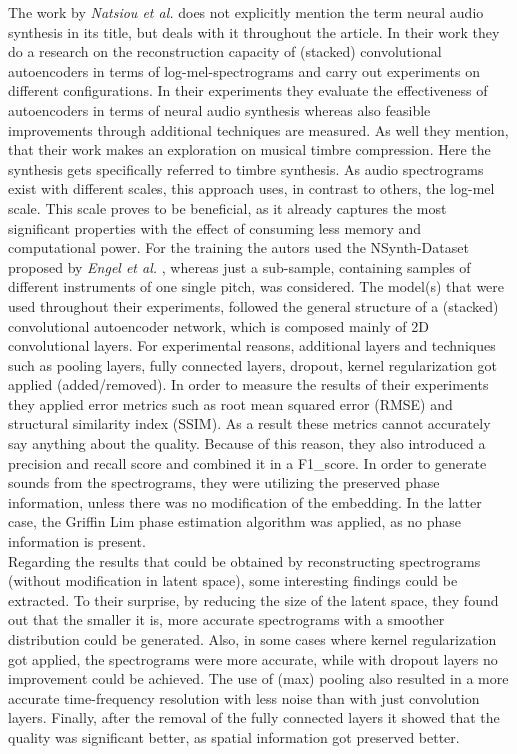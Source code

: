 The work by \textit{Natsiou et al.} does not explicitly mention the term neural audio synthesis in its title, but deals with it throughout the article. \cite{Natsiou2023} In their work they do a research on the reconstruction capacity of (stacked) convolutional autoencoders in terms of log-mel-spectrograms and carry out experiments on different configurations. In their experiments they evaluate the effectiveness of autoencoders in terms of neural audio synthesis whereas also feasible improvements through additional techniques are measured. As well they mention, that their work makes an exploration on musical timbre compression. Here the synthesis gets specifically referred to timbre synthesis. As audio spectrograms exist with different scales, this approach uses, in contrast to others, the log-mel scale. This scale proves to be beneficial, as it already captures the most significant properties with the effect of consuming less memory and computational power. For the training the autors used the NSynth-Dataset proposed by \textit{Engel et al. } \cite{Engel2017}, whereas just a sub-sample, containing samples of different instruments of one single pitch, was considered. The model(s) that were used throughout their experiments, followed the general structure of a (stacked) convolutional autoencoder network, which is composed mainly of 2D convolutional layers. For experimental reasons, additional layers and techniques such as pooling layers, fully connected layers, dropout, kernel regularization got applied (added/removed). In order to measure the results of their experiments they applied error metrics such as root mean squared error (RMSE) and structural similarity index (SSIM). As a result these metrics cannot accurately say anything about the quality. Because of this reason, they also introduced a precision and recall score and combined it in a F1\_score. In order to generate sounds from the spectrograms, they were utilizing the preserved phase information, unless there was no modification of the embedding. In the latter case, the Griffin Lim phase estimation algorithm was applied, as no phase information is present.\\
Regarding the results that could be obtained by reconstructing spectrograms (without modification in latent space), some interesting findings could be extracted. To their surprise, by reducing the size of the latent space, they found out that the smaller it is, more accurate spectrograms with a smoother distribution could be generated. Also, in some cases where kernel regularization got applied, the spectrograms were more accurate, while with dropout layers no improvement could be achieved. The use of (max) pooling also resulted in a more accurate time-frequency resolution with less noise than with just convolution layers. Finally, after the removal of the fully connected  layers it showed that the quality was significant better, as spatial information got preserved better.\\

